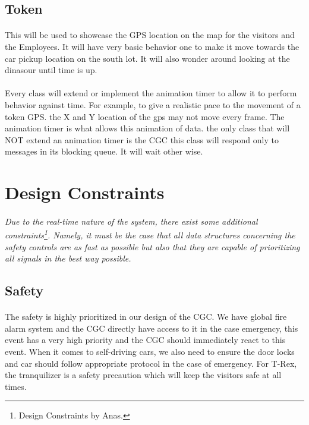 \documentclass[12pt]{article}
\begin{document}
\subsection{Token}
\paragraph{} This will be used to showcase the GPS location on the map for the visitors and the Employees. It will have very basic behavior one 
to make it move towards the car pickup location on the south lot. It will also wonder around looking at the dinasour until time is up.

\paragraph{}Every class will extend or implement the animation timer to allow it to perform behavior against time. For example, 
to give a realistic pace to the movement of a token GPS. the X and Y location of the gps may not move every frame. The animation timer is what allows this animation of data.
the only class that will NOT extend an animation timer is the CGC this class will respond only to messages in its blocking queue. It will wait other wise.

\section{Design Constraints} \label{cons}
\paragraph{} \textit{Due to the real-time nature of the system, there exist some additional 
constraints\footnote{Design Constraints by Anas.}. Namely, it must be the case that all data 
structures concerning the safety controls are as fast as possible but also that they are capable 
of prioritizing all signals in the best way possible.}

    \subsection{Safety}
    \paragraph{} The safety is highly prioritized in our design of the CGC. We have 
    global fire alarm system and the CGC directly have access to it in the case 
    emergency, this event has a very high priority and the CGC 
    should immediately react to this event. When it comes to self-driving cars, we also need to ensure the door locks
    and car should follow appropriate protocol in the case of emergency. For T-Rex, the tranquilizer is a safety precaution which will 
    keep the visitors safe at all times.
\end{document}
